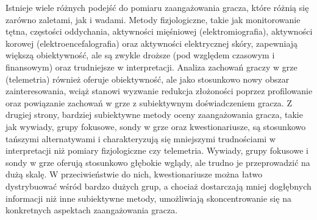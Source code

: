 Istnieje wiele różnych podejść do pomiaru zaangażowania gracza, które różnią się zarówno zaletami,
jak i wadami. Metody fizjologiczne, takie jak monitorowanie tętna, częstości oddychania, aktywności
mięśniowej (elektromiografia), aktywności korowej (elektroencefalografia) oraz aktywności elektrycznej
skóry, zapewniają większą obiektywność, ale są zwykle droższe (pod względem czasowym i finansowym) oraz
trudniejsze w interpretacji\cite{validation_of_ge_scales}.
Analiza zachowań graczy w grze (telemetria) również oferuje obiektywność,
ale jako stosunkowo nowy obszar zainteresowania, wciąż stanowi wyzwanie redukcja złożoności poprzez
profilowanie oraz powiązanie zachowań w grze z subiektywnym doświadczeniem gracza. Z drugiej strony,
bardziej subiektywne metody oceny zaangażowania gracza, takie jak wywiady, grupy fokusowe, sondy w grze oraz
kwestionariusze, są stosunkowo tańszymi alternatywami i charakteryzują się mniejszymi trudnościami w
interpretacji niż pomiary fizjologiczne czy telemetria\cite{validation_of_ge_scales}.
Wywiady, grupy fokusowe i sondy w grze oferują stosunkowo głębokie wglądy, ale trudno je przeprowadzić na
dużą skalę. W przeciwieństwie do nich, kwestionariusze można łatwo dystrybuować wśród bardzo dużych grup,
a chociaż dostarczają mniej dogłębnych informacji niż inne subiektywne metody, umożliwiają skoncentrowanie
się na konkretnych aspektach zaangażowania gracza\cite{validation_of_ge_scales}.

